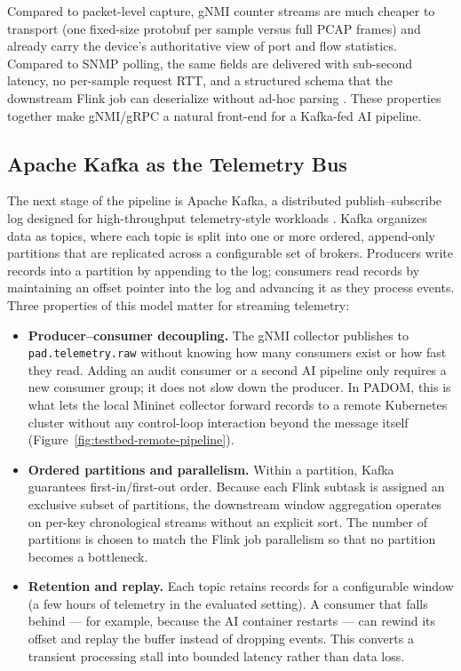 \documentclass[12pt, a4paper, reqno, oneside]{book}
\newcommand{\padonap}{\textsc{PADOM}}
\begin{document}
Compared to packet-level capture, gNMI counter streams are much cheaper to
transport (one fixed-size protobuf per sample versus full PCAP frames) and
already carry the device's authoritative view of port and flow statistics.
Compared to SNMP polling, the same fields are delivered with sub-second
latency, no per-sample request RTT, and a structured schema that the
downstream Flink job can deserialize without ad-hoc parsing
\cite{su2024ddos_sdn_survey}. These properties together make gNMI/gRPC a
natural front-end for a Kafka-fed AI pipeline.

\subsection{Apache Kafka as the Telemetry Bus}
\label{subsec:kafka-bg}

The next stage of the pipeline is Apache Kafka, a distributed
publish--subscribe log designed for high-throughput telemetry-style workloads
\cite{kafka_kreps2011}. Kafka organizes data as topics, where each
topic is split into one or more ordered, append-only partitions that
are replicated across a configurable set of brokers. Producers write records
into a partition by appending to the log; consumers read records by
maintaining an offset pointer into the log and advancing it as they
process events. Three properties of this model matter for streaming
telemetry:

\begin{itemize}
    \item \textbf{Producer--consumer decoupling.} The gNMI collector
          publishes to \texttt{pad.telemetry.raw} without knowing how many
          consumers exist or how fast they read. Adding an audit consumer or
          a second AI pipeline only requires a new consumer group; it does
          not slow down the producer. In \padonap{}, this is what lets the
          local Mininet collector forward records to a remote Kubernetes
          cluster without any control-loop interaction beyond the message
          itself (Figure~\ref{fig:testbed-remote-pipeline}).

    \item \textbf{Ordered partitions and parallelism.} Within a partition,
          Kafka guarantees first-in/first-out order. Because each Flink
          subtask is assigned an exclusive subset of partitions, the
          downstream window aggregation operates on per-key chronological
          streams without an explicit sort. The number of partitions is
          chosen to match the Flink job parallelism so that no partition
          becomes a bottleneck.

    \item \textbf{Retention and replay.} Each topic retains records for a
          configurable window (a few hours of telemetry in the evaluated setting). A
          consumer that falls behind --- for example, because the AI
          container restarts --- can rewind its offset and replay the buffer
          instead of dropping events. This converts a transient processing
          stall into bounded latency rather than data loss.
\end{itemize}
\end{document}
